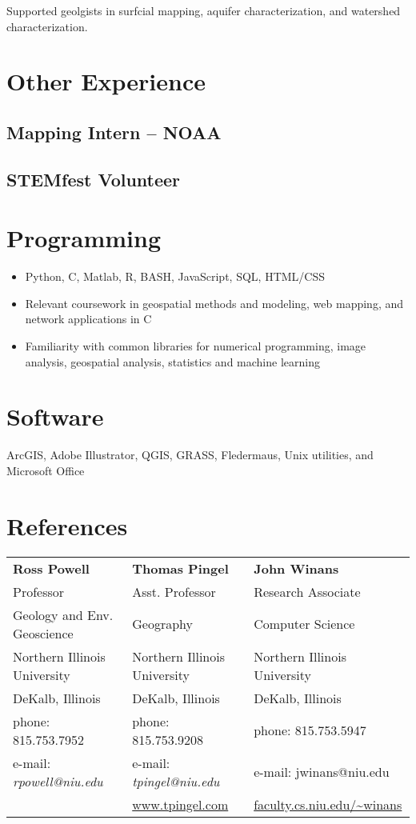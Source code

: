 \documentclass{cv_TOH}
\begin{document}

Supported geolgists in surfcial mapping, aquifer characterization, and watershed characterization.

\section{Other Experience}
\subsection{Mapping Intern -- NOAA}
\subsection{STEMfest Volunteer}
\section{Programming}
\begin{itemize}
\item Python, C, Matlab, R, BASH, JavaScript, SQL, HTML/CSS
\item Relevant coursework in geospatial methods and modeling, web mapping, and network applications in C
\item Familiarity with common libraries for numerical programming, image analysis, geospatial analysis, statistics and machine learning
\end{itemize}

\section{Software}
ArcGIS, Adobe Illustrator, QGIS, GRASS, Fledermaus, Unix utilities, and Microsoft Office

\section{References}
\begin{tabular}{@{}p{6cm}p{6cm}p{6cm}}
\textbf{Ross Powell}                  &  \textbf{Thomas Pingel}            & \textbf{John Winans}   \\
Professor                             &  Asst. Professor                   &  Research Associate    \\
Geology and Env. Geoscience           &  Geography                         &  Computer Science      \\
Northern Illinois University          &  Northern Illinois University      &  Northern Illinois University \\
DeKalb, Illinois                      &  DeKalb, Illinois                  &  DeKalb, Illinois  \\
phone: 815.753.7952                   &  phone: 815.753.9208               &  phone: 815.753.5947  \\
e-mail: \textsl{rpowell@niu.edu}      &  e-mail: \textsl{tpingel@niu.edu}  &  e-mail: jwinans@niu.edu   \\
                                      &  \url{www.tpingel.com}             &  \url{faculty.cs.niu.edu/~winans} \\
\end{tabular}
\end{document}
